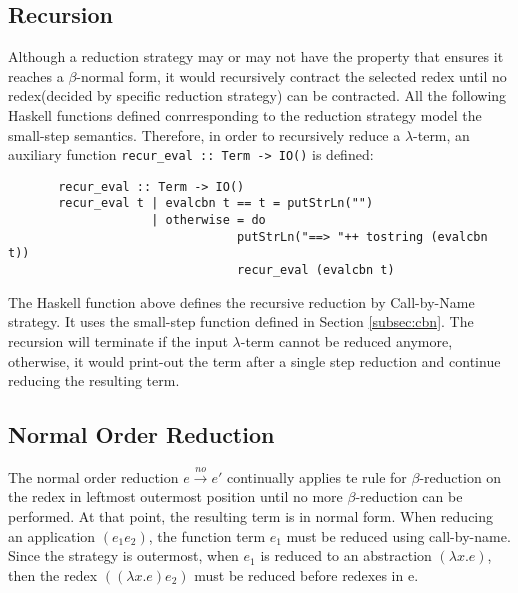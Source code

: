 \subsection*{Recursion}

Although a reduction strategy may or may not have the property that ensures it reaches a $\beta$-normal form, it would recursively contract the selected redex until no redex(decided by specific reduction strategy) can be contracted. All the following Haskell functions defined conrresponding to the reduction strategy model the small-step semantics. Therefore, in order to recursively reduce a $\lambda$-term, an auxiliary function \verb|recur_eval :: Term -> IO()| is defined:

\begin{verbatim}
       recur_eval :: Term -> IO()
       recur_eval t | evalcbn t == t = putStrLn("")
                    | otherwise = do
                                putStrLn("==> "++ tostring (evalcbn t))
                                recur_eval (evalcbn t)
\end{verbatim}

The Haskell function above defines the recursive reduction by Call-by-Name strategy. It uses the small-step function defined in Section \ref{subsec:cbn}. The recursion will terminate if the input $\lambda$-term cannot be reduced anymore, otherwise, it would print-out the term after a single step reduction and continue reducing the resulting term.



\subsection{Normal Order Reduction}{\label{subsec:normal}}

The normal order reduction $e\xrightarrow{no} e'$ continually applies te rule for $\beta$-reduction on the redex in leftmost outermost position until no more $\beta$-reduction can be performed. At that point, the resulting term is in normal form. When reducing an application $(e_1e_2)$, the function term $e_1$ must be reduced using call-by-name. Since the strategy is outermost, when $e_1$ is reduced to an abstraction $(\lambda x.e)$, then the redex $((\lambda x.e)e_2)$ must be reduced before redexes in e.

